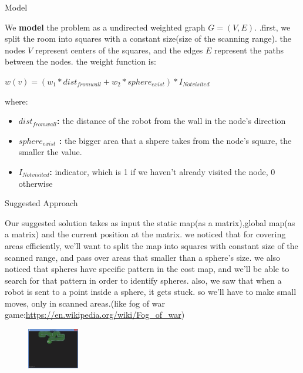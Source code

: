 \documentclass[10pt]{beamer}
\begin{document}
\begin{frame}{Model}

We {\bf model} the problem as a undirected weighted graph $G=(V, E)$. .first, we split the room into squares with a constant size(size of the scanning range). the nodes $V$ represent centers of the squares, and the edges $E$ represent the paths between the nodes.
the weight function is: 
\begin{itemize}
$w(v) = (w_1*dist_{from wall}+w_2*sphere_{exist})*I_{Notvisited} $
\end{itemize}
where:
\begin{itemize}
\begin{itemize}
    \item {\bf $dist_{from wall}$:} { the distance of the robot from the wall in the node's direction}    
\end{itemize}
\begin{itemize}
    \item {\bf $sphere_{exist}$ :} { the bigger area that a shpere takes from the node's square, the smaller the value.}
\end{itemize}
\begin{itemize}
    \item {\bf $I_{Notvisited} $:} { indicator, which is 1 if we haven't already visited the node, 0 otherwise}    
\end{itemize}
\end{itemize}
\end{frame}


\begin{frame}{Suggested Approach}

Our suggested solution takes as input the static map(as a matrix),global map(as a matrix) and the current position at the matrix. we noticed that for covering areas efficiently, we'll want to split the map into squares with constant size of the scanned range, and pass over areas that smaller than a sphere's size.
we also noticed that spheres have specific pattern in the cost map, and we'll be able to search for that pattern in order to identify spheres. also, we saw that when a robot is sent to a point inside a sphere, it gets stuck. so we'll have to make small moves, only in scanned areas.(like fog of war game:\url{https://en.wikipedia.org/wiki/Fog_of_war})

\begin{figure}[t]
		\centering
		\includegraphics[width=0.2\textwidth]{images/fog.png}
    \end{figure}\hfill
\end{frame}
\end{document}

